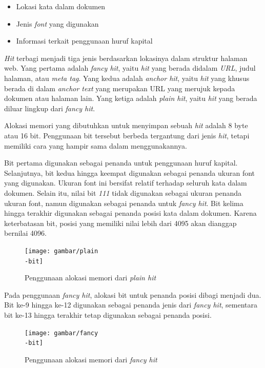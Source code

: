 \begin{itemize}
  \item{Lokasi kata dalam dokumen}
  \item{Jenis \emph{font} yang digunakan}
  \item{Informasi terkait penggunaan huruf kapital}
\end{itemize}

\emph{Hit} terbagi menjadi tiga jenis berdasarkan lokasinya dalam struktur
halaman web. Yang pertama adalah \emph{fancy hit}, yaitu \emph{hit} yang berada
didalam \emph{URL}, judul halaman, atau \emph{meta tag}. Yang kedua adalah
\emph{anchor hit}, yaitu \emph{hit} yang khusus berada di dalam
\emph{anchor text} yang merupakan URL yang merujuk kepada dokumen atau halaman
lain. Yang ketiga adalah \emph{plain hit}, yaitu \emph{hit} yang berada diluar
lingkup dari \emph{fancy hit}.

Alokasi memori yang dibutuhkan untuk menyimpan sebuah \emph{hit} adalah 8 byte
atau 16 bit. Penggunaan bit tersebut berbeda tergantung dari jenis \emph{hit},
tetapi memiliki cara yang hampir sama dalam menggunakannya. 

Bit pertama digunakan sebagai penanda untuk penggunaan huruf kapital.
Selanjutnya, bit kedua hingga keempat digunakan sebagai penanda ukuran font yang
digunakan. Ukuran font ini bersifat relatif terhadap seluruh kata dalam dokumen.
Selain itu, nilai bit \emph{111} tidak digunakan sebagai ukuran penanda ukuran
font, namun digunakan sebagai penanda untuk \emph{fancy hit}. Bit kelima hingga
terakhir digunakan sebagai penanda posisi kata dalam dokumen. Karena
keterbatasan bit, posisi yang memiliki nilai lebih dari 4095 akan dianggap
bernilai 4096.

\begin{figure}[H]
  \centering{}
	\texttt{[image: gambar/plain\\-bit]}
  \caption{Penggunaan alokasi memori dari \emph{plain hit}}
\end{figure}

Pada penggunaan \emph{fancy hit}, alokasi bit untuk penanda posisi dibagi
menjadi dua. Bit ke-9 hingga ke-12 digunakan sebagai penanda jenis dari
\emph{fancy hit}, sementara bit ke-13 hingga terakhir tetap digunakan sebagai
penanda posisi.

\begin{figure}[H]
  \centering{}
	\texttt{[image: gambar/fancy\\-bit]}
  \caption{Penggunaan alokasi memori dari \emph{fancy hit}}
\end{figure}


